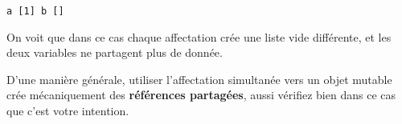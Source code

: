    \begin{Verbatim}[commandchars=\\\{\},frame=single,framerule=0.3mm,rulecolor=\color{cellframecolor}]
a [1] b []
\end{Verbatim}

    On voit que dans ce cas chaque affectation crée une liste vide
différente, et les deux variables ne partagent plus de donnée.

    D'une manière générale, utiliser l'affectation simultanée vers un objet
mutable crée mécaniquement des \textbf{références partagées}, aussi
vérifiez bien dans ce cas que c'est votre intention.


    
    
    
